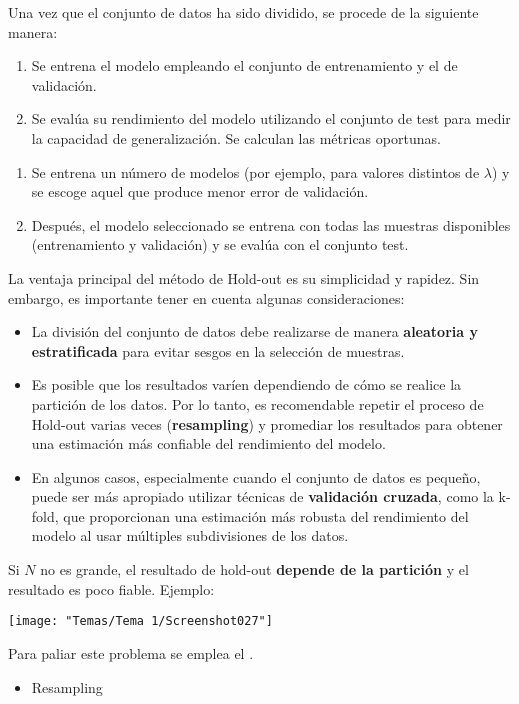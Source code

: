 Una vez que el conjunto de datos ha sido dividido, se procede de la siguiente manera:
\begin{enumerate}[label=\color{lightblue}\arabic*)]
	\item Se entrena el modelo empleando el conjunto de entrenamiento y el de validación.
	\item Se evalúa su rendimiento del modelo utilizando el conjunto de test para medir la capacidad de generalización. Se calculan las métricas oportunas.
\end{enumerate}
\begin{enumerate}[label=\color{lightblue}\arabic*)]
	\item Se entrena un número de modelos (por ejemplo, para valores distintos de $\lambda$) y se escoge aquel que produce menor error de validación.
	\item Después, el modelo seleccionado se entrena con todas las muestras disponibles (entrenamiento y validación) y se evalúa con el conjunto test.
\end{enumerate}
La ventaja principal del método de Hold-out es su simplicidad y rapidez. Sin embargo, es importante tener en cuenta algunas consideraciones:
\begin{itemize}
	\item La división del conjunto de datos debe realizarse de manera \textbf{aleatoria y estratificada} para evitar sesgos en la selección de muestras.
	\item Es posible que los resultados varíen dependiendo de cómo se realice la partición de los datos. Por lo tanto, es recomendable repetir el proceso de Hold-out varias veces (\textbf{resampling}) y promediar los resultados para obtener una estimación más confiable del rendimiento del modelo.
	\item En algunos casos, especialmente cuando el conjunto de datos es pequeño, puede ser más apropiado utilizar técnicas de \textbf{validación cruzada}, como la k-fold, que proporcionan una estimación más robusta del rendimiento del modelo al usar múltiples subdivisiones de los datos.
\end{itemize}
Si $N$ no es grande, el resultado de hold-out \textbf{depende de la partición} y el resultado es poco fiable. Ejemplo: 
\begin{center}
\texttt{[image: "Temas/Tema 1/Screenshot027"]}
\end{center}
Para paliar este problema se emplea el .
\begin{itemize}[label=\color{red}\textbullet, leftmargin=*]
	\item \color{lightblue}Resampling
\end{itemize}

